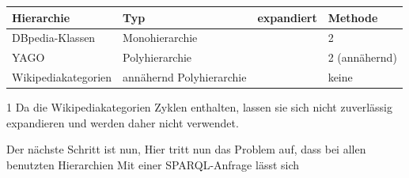 \begin{table}[h]
\begin{threeparttable}
\begin{tabular}{llll}
\toprule 
Hierarchie		&Typ				&expandiert	&Methode\\
\midrule
DBpedia-Klassen		&Monohierarchie			&\checkmark	&2\\
YAGO			&Polyhierarchie			&		&2 (annähernd)\\
Wikipediakategorien	&annähernd Polyhierarchie	&		&keine\tnote{1}\\
\bottomrule
\end{tabular}
\footnotesize
\begin{tablenotes}
 \item [1] Da die Wikipediakategorien Zyklen enthalten, lassen sie sich nicht zuverlässig expandieren und werden daher nicht verwendet.
\end{tablenotes}

\end{threeparttable}
\end{table}





%   
\iffalse
Der nächste Schritt ist nun, 
Hier tritt nun das Problem auf, dass bei allen benutzten Hierarchien 
Mit einer SPARQL-Anfrage lässt sich 

